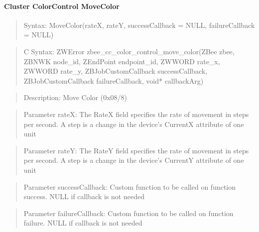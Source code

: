 \paragraph{Cluster ColorControl MoveColor}
\begin{quote}Syntax: MoveColor(rateX, rateY, successCallback = NULL, failureCallback = NULL)\end{quote}
\begin{quote}C Syntax: ZWError zbee\_cc\_color\_control\_move\_color(ZBee zbee, ZBNWK node\_id, ZEndPoint endpoint\_id, ZWWORD rate\_x, ZWWORD rate\_y, ZBJobCustomCallback successCallback, ZBJobCustomCallback failureCallback, void* callbackArg)\end{quote}
\begin{quote}Description: Move Color (0x08/8)\end{quote}
\begin{quote}Parameter rateX: The RateX field specifies the rate of movement in steps per second. A step is a change in the device's CurrentX attribute of one unit\end{quote}
\begin{quote}Parameter rateY: The RateY field specifies the rate of movement in steps per second. A step is a change in the device's CurrentY attribute of one unit\end{quote}
\begin{quote}Parameter successCallback: Custom function to be called on function success. NULL if callback is not needed\end{quote}
\begin{quote}Parameter failureCallback: Custom function to be called on function failure. NULL if callback is not needed\end{quote}


